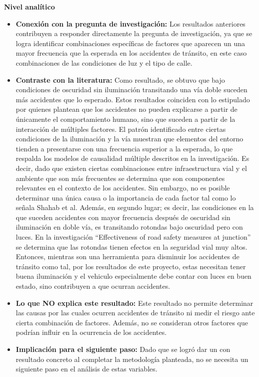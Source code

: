 \documentclass[12pt]{article}
\begin{document}
\textbf{Nivel analítico}
\begin{itemize}
  \item \textbf{Conexión con la pregunta de investigación:} Los resultados anteriores 
  contribuyen a responder directamente la pregunta de investigación, ya que se 
  logra identificar combinaciones específicas de factores que aparecen un una mayor 
  frecuencia que la esperada en los accidentes de tránsito, en este caso combinaciones 
  de las condiciones de luz y el tipo de calle. 

  \item \textbf{Contraste con la literatura:} 
  Como resultado, se obtuvo que bajo 
  condiciones de oscuridad sin iluminación transitando una vía doble suceden más 
  accidentes que lo esperado. Estos resultados coinciden con lo estipulado por 
  \textcite{HOSSEINIAN2012} quienes plantean que los accidentes no pueden explicarse 
  a partir de únicamente el comportamiento humano, sino que suceden a partir de 
  la interacción de múltiples factores. El patrón identificado entre ciertas 
  condiciones de la iluminación y la vía muestran que elementos del entorno 
  tienden a presentarse con una frecuencia superior a la esperada, lo que 
  respalda los modelos de causalidad múltiple descritos en la investigación. 
  Es decir, dado que existen ciertas combinaciones entre infraestructura vial y 
  el ambiente que son más frecuentes se determina que son componentes relevantes 
  en el contexto de los accidentes. Sin embargo, no es posible determinar una única 
  causa o la importancia de cada factor tal como lo señala Shahab et al. 
  Además, en segundo lugar; es decir, las condiciones en la que suceden 
accidentes con mayor frecuencia después de oscuridad sin iluminación en doble vía, 
es transitando rotondas bajo oscuridad pero con luces. En la investigación 
“Effectiveness of road safety measures at junction” \textcite{yannis_effectiveness_junctions} se determina que las rotondas 
tienen efectos en la seguridad vial muy altos. Entonces, mientras son una herramienta 
para disminuir los accidentes de tránsito como tal, por los resultados de este proyecto, 
estas necesitan tener buena iluminación y el vehiculo especialmente debe contar con luces 
en buen estado, sino contribuyen a que ocurran accidentes. 

  \item \textbf{Lo que NO explica este resultado:} Este resultado no permite determinar
  las causas por las cuales ocurren accidentes de tránsito ni medir el riesgo ante 
  cierta combinación de factores. Además, no se consideran otros factores que podrían 
  influir en la ocurrencia de los accidentes.  

  \item \textbf{Implicación para el siguiente paso:} Dado que se logró dar un con 
  resultado concreto al completar la metodología planteada, no se necesita un 
  siguiente paso en el análisis de estas variables. \\
\end{itemize}
\end{document}
